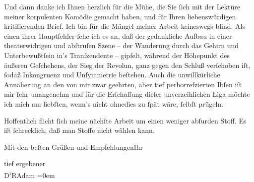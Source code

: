 \pstart
           Und dann danke ich Ihnen herzlich für die Mühe, die Sie ſich mit der Lektüre meiner
               korpulenten Komödie gemacht
               haben, und für Ihren liebenswürdigen kritiſierenden Brief. Ich bin für die Mängel
               meiner Arbeit keineswegs blind. Als einen ihrer Hauptfehler ſehe ich es an, daß der
               gedankliche Aufbau in einer theaterwidrigen und abſtruſen Szene – der Wanderung durch
               das Gehirn {\pb}und Unterbewußtſein in’s
               Tranſzendente – gipfelt, während der Höhepunkt des äußeren Geſchehens, der Sieg der
                  Revolun, ganz gegen den Schluß verſchoben iſt, ſodaß Inkongruenz und Unſymmetrie
               beſtehen. Auch die unwillkürliche Annäherung an den von mir zwar geehrten, aber tief
               perhorreſzierten Ibſen iſt mir ſehr unangenehm
               und für die Erſchaffung dieſer unverzeihlichen Liga möchte ich mich am liebſten,
               wenn’s nicht ohnedies zu ſpät wäre, ſelbſt prügeln.\pend
           
\pstart
           Hoffentlich flicht ſich meine nächſte Arbeit um einen weniger abſurden Stoff. Es iſt
               ſchrecklich, daß man Stoffe nicht wählen kann.\pend
           
\pstart
           Mit den beſten Grüßen und Empfehlungen\hspace*{1.5em}Ihr\pend
           
\pstart
           tief ergebener{\\[\baselineskip]}\spacefill\mbox{D\textsuperscript{r}RAdam}\pend
           \leftskip=0em{}\endnumbering{}  
      